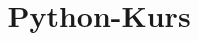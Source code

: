 \documentclass[]{tudbeamer}
\title{Python-Kurs}
\begin{document}
\maketitle

\begin{frame}
\tableofcontents
\end{frame}


\end{document}
